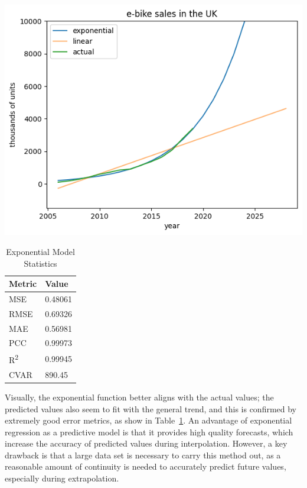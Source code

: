 \begin{table}[h]
    \begin{minipage}{0.7\linewidth}
        \centering
        \includegraphics[width=\textwidth]{exponential}%
        \label{fig:ebike_exp}
    \end{minipage}%
    \begin{minipage}{0.3\linewidth}
        \centering
        \begin{tabular}{ll}
            \toprule
            Metric               & Value   \\
            \midrule
            MSE                  & 0.48061 \\
            RMSE                 & 0.69326 \\
            MAE                  & 0.56981 \\
            PCC                  & 0.99973 \\
            R\textsuperscript{2} & 0.99945 \\
            CVAR                 & 890.45  \\
            \bottomrule
        \end{tabular}
        \vspace{8pt}
        \caption{Exponential Model Statistics}
        \label{tab:ebike_exp_err}
    \end{minipage}
\end{table}

Visually, the exponential function better aligns with the actual values; the predicted values also seem to fit with the general trend, and this is confirmed by extremely good error metrics, as show in Table~\ref{tab:ebike_exp_err}.
An advantage of exponential regression as a predictive model is that it provides high quality forecasts, which increase the accuracy of predicted values during interpolation.
However, a key drawback is that a large data set is necessary to carry this method out, as a reasonable amount of continuity is needed to accurately predict future values, especially during extrapolation.

